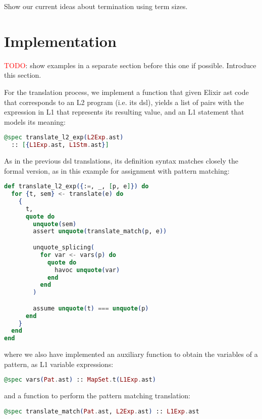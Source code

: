 Show our current ideas about termination using term sizes.

\section{Implementation}

\textcolor{red}{TODO}: show examples in a separate section before this one if possible. Introduce this section.

For the translation process, we implement a function that given Elixir \gls{ast}
code that corresponds to an L2 program (i.e. its \gls{dsl}), yields a list of
pairs with the expression in L1 that represents its resulting value, and an L1
statement that models its meaning:

\begin{lstlisting}[language=elixir,numbers=none,frame=none]
@spec translate_l2_exp(L2Exp.ast) 
  :: [{L1Exp.ast, L1Stm.ast}]
\end{lstlisting}

As in the previous \gls{dsl} translations, its definition syntax matches closely
the formal version, as in this example for assignment with pattern matching:

\begin{lstlisting}[language=elixir,numbers=none,frame=none]
def translate_l2_exp({:=, _, [p, e]}) do
  for {t, sem} <- translate(e) do
    {
      t,
      quote do
        unquote(sem)
        assert unquote(translate_match(p, e))

        unquote_splicing(
          for var <- vars(p) do
            quote do
              havoc unquote(var)
            end
          end
        )

        assume unquote(t) === unquote(p)
      end
    }
  end
end
\end{lstlisting}

where we also have implemented an auxiliary function to obtain the variables of
a pattern, as L1 variable expressions:

\begin{lstlisting}[language=elixir,numbers=none,frame=none]
@spec vars(Pat.ast) :: MapSet.t(L1Exp.ast)
\end{lstlisting}

and a function to perform the pattern matching translation:

\begin{lstlisting}[language=elixir,numbers=none,frame=none]
@spec translate_match(Pat.ast, L2Exp.ast) :: L1Exp.ast
\end{lstlisting}

